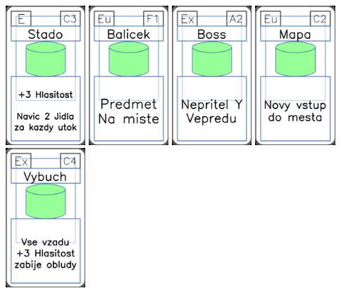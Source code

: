 \documentclass[a4paper]{article}
\begin{document}
	\includegraphics[width=3.0cm]{img-4_42}
	\includegraphics[width=3.0cm]{img-4_25}
	\includegraphics[width=3.0cm]{img-4_1}
	\includegraphics[width=3.0cm]{img-4_41}
	\includegraphics[width=3.0cm]{img-4_13}
\end{document}
